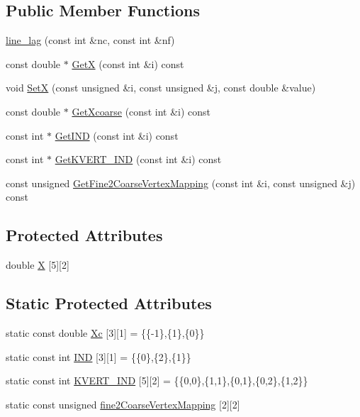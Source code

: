 \subsection*{Public Member Functions}
\begin{DoxyCompactItemize}
\item 
\mbox{\hyperlink{classfemus_1_1line__lag_a77a33a3d152267c54cc88c4bdaaffc5c}{line\+\_\+lag}} (const int \&nc, const int \&nf)
\item 
const double $\ast$ \mbox{\hyperlink{classfemus_1_1line__lag_a7bb107fa83cf2cc51202f96f10167dc8}{GetX}} (const int \&i) const
\item 
void \mbox{\hyperlink{classfemus_1_1line__lag_a7b6b910b65c797ed3659b38044c3d1d7}{SetX}} (const unsigned \&i, const unsigned \&j, const double \&value)
\item 
const double $\ast$ \mbox{\hyperlink{classfemus_1_1line__lag_aea0db4bd5a70c069b7cbf3f2f92a0c79}{Get\+Xcoarse}} (const int \&i) const
\item 
const int $\ast$ \mbox{\hyperlink{classfemus_1_1line__lag_ae8291eceb0b48fd46da4112a75832ad2}{Get\+I\+ND}} (const int \&i) const
\item 
const int $\ast$ \mbox{\hyperlink{classfemus_1_1line__lag_af8c8c5450968f7e99f0229743c3098c8}{Get\+K\+V\+E\+R\+T\+\_\+\+I\+ND}} (const int \&i) const
\item 
const unsigned \mbox{\hyperlink{classfemus_1_1line__lag_a531a67a6075079df980485134a2ca93a}{Get\+Fine2\+Coarse\+Vertex\+Mapping}} (const int \&i, const unsigned \&j) const
\end{DoxyCompactItemize}
\subsection*{Protected Attributes}
\begin{DoxyCompactItemize}
\item 
double \mbox{\hyperlink{classfemus_1_1line__lag_a05de5a2bda79830b789f13fb6ec70a8f}{X}} \mbox{[}5\mbox{]}\mbox{[}2\mbox{]}
\end{DoxyCompactItemize}
\subsection*{Static Protected Attributes}
\begin{DoxyCompactItemize}
\item 
static const double \mbox{\hyperlink{classfemus_1_1line__lag_a4c321de90e3e4b98ab096433f7c52bae}{Xc}} \mbox{[}3\mbox{]}\mbox{[}1\mbox{]} = \{\{-\/1\},\{1\},\{0\}\}
\item 
static const int \mbox{\hyperlink{classfemus_1_1line__lag_a02689247a2ae79b30815677cc774e39b}{I\+ND}} \mbox{[}3\mbox{]}\mbox{[}1\mbox{]} = \{\{0\},\{2\},\{1\}\}
\item 
static const int \mbox{\hyperlink{classfemus_1_1line__lag_aaa6904188b4ff24d76fa83ac6c25d84e}{K\+V\+E\+R\+T\+\_\+\+I\+ND}} \mbox{[}5\mbox{]}\mbox{[}2\mbox{]} = \{\{0,0\},\{1,1\},\{0,1\},\{0,2\},\{1,2\}\}
\item 
static const unsigned \mbox{\hyperlink{classfemus_1_1line__lag_a9ee52ffd10242066fb6f52ce7810f135}{fine2\+Coarse\+Vertex\+Mapping}} \mbox{[}2\mbox{]}\mbox{[}2\mbox{]}
\end{DoxyCompactItemize}
